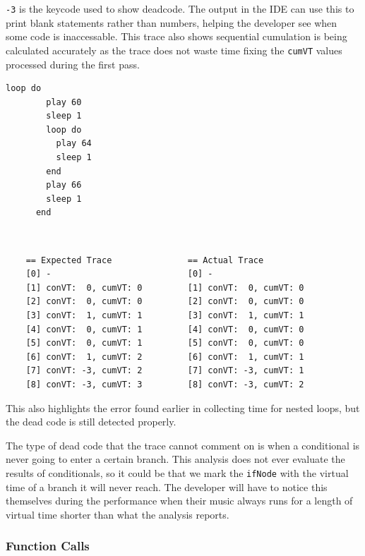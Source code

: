 \documentclass[11pt, abstracton, twoside, titlepage=true]{scrartcl}
\begin{document}
\texttt{-3} is the keycode used to show deadcode. The output in the IDE can use 
this to print blank statements rather than numbers, helping the developer see
when some code is inaccessable. This trace also shows sequential cumulation is 
being calculated accurately as the trace does not waste time fixing the 
\texttt{cumVT} values processed during the first pass.

\begin{minipage}{\textwidth}
	\begin{lstlisting}[style = sonicpi]
      loop do
        play 60
        sleep 1
        loop do
          play 64
          sleep 1
        end
        play 66
        sleep 1
      end
	\end{lstlisting}
\end{minipage}
\\
\begin{lstlisting}
    == Expected Trace               == Actual Trace
    [0] -                           [0] -
    [1] conVT:  0, cumVT: 0         [1] conVT:  0, cumVT: 0
    [2] conVT:  0, cumVT: 0         [2] conVT:  0, cumVT: 0
    [3] conVT:  1, cumVT: 1         [3] conVT:  1, cumVT: 1
    [4] conVT:  0, cumVT: 1         [4] conVT:  0, cumVT: 0
    [5] conVT:  0, cumVT: 1         [5] conVT:  0, cumVT: 0
    [6] conVT:  1, cumVT: 2         [6] conVT:  1, cumVT: 1
    [7] conVT: -3, cumVT: 2         [7] conVT: -3, cumVT: 1
    [8] conVT: -3, cumVT: 3         [8] conVT: -3, cumVT: 2
\end{lstlisting}

This also highlights the error found earlier in collecting time for nested loops, 
but the dead code is still detected properly.

The type of dead code that the trace cannot comment on is when a conditional is 
never going to enter a certain branch. This analysis does not ever evaluate the 
results of conditionals, so it could be that we mark the \texttt{ifNode} with the 
virtual time of a branch it will never reach. The developer will have to notice this 
themselves during the performance when their music always runs for a length of 
virtual time shorter than what the analysis reports.

\subsubsection{Function Calls} \label{evalFunc}
\end{document}
